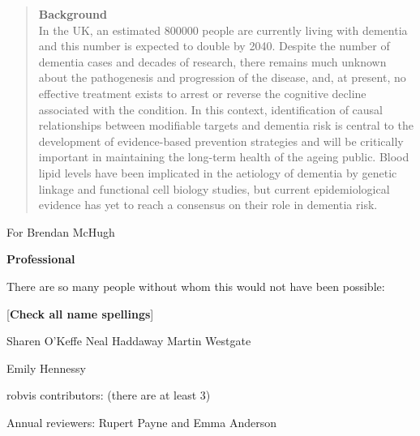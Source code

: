\documentclass[a4paper, twoside]{templates/ociamthesis}
\begin{document}
\begin{romanpages}

\maketitle

\begin{abstract}
	\textbf{Background}\\
 In the UK, an estimated 800000 people are currently living with dementia and this number is expected to double
 by 2040. Despite the number of dementia cases and decades of research, there remains much unknown about
 the pathogenesis and progression of the disease, and, at present, no effective treatment exists to arrest or
 reverse the cognitive decline associated with the condition. In this context, identification of causal relationships
 between modifiable targets and dementia risk is central to the development of evidence-based prevention
 strategies and will be critically important in maintaining the long-term health of the ageing public. Blood lipid
 levels have been implicated in the aetiology of dementia by genetic linkage and functional cell biology studies,
 but current epidemiological evidence has yet to reach a consensus on their role in dementia risk.
\end{abstract}

\begin{dedication}
  For Brendan McHugh
\end{dedication}

\begin{acknowledgements}
 	\textbf{Professional}

  There are so many people without whom this would not have been possible:

  {[}\textbf{Check all name spellings}{]}

  Sharen O'Keffe
  Neal Haddaway
  Martin Westgate

  Emily Hennessy

  robvis contributors: (there are at least 3)

  Annual reviewers: Rupert Payne and Emma Anderson


\end{acknowledgements}
\end{romanpages}
\end{document}
